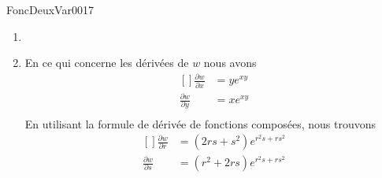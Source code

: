 

\begin{corrige}{FoncDeuxVar0017}

	\begin{enumerate}

		\item
		\item
			En ce qui concerne les dérivées de $w$ nous avons
			\begin{equation}
				\begin{aligned}[]
					\frac{ \partial w }{ \partial x }&=y e^{xy}\\
					\frac{ \partial w }{ \partial y }&=x e^{xy}\\
				\end{aligned}
			\end{equation}
			En utilisant la formule de dérivée de fonctions composées, nous trouvons
			\begin{equation}
				\begin{aligned}[]
					\frac{ \partial w }{ \partial r }&=(2rs + s^2)e^{r^2s + rs^2}\\
					\frac{ \partial w }{ \partial s }&=(r^2 + 2rs)e^{r^2s + rs^2}
				\end{aligned}
			\end{equation}
			
	\end{enumerate}

\end{corrige}
